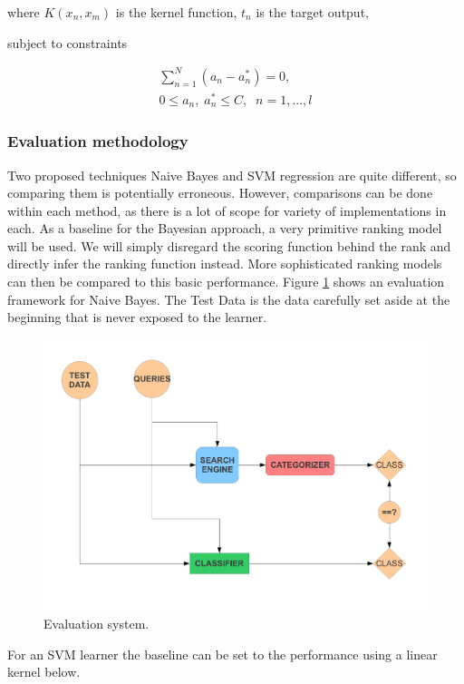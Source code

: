\documentclass[12pt,twoside,notitlepage]{report}
\begin{document}
where \(K(x_n,x_m) \) is the kernel function, \(t_n\) is the target output,

subject to constraints

\begin{gather}
  \sum_{n=1}^{N}(a_n-a_n^*)=0,\\
  0\leq a_n,\; a_n^*\leq C,\;\;    n=1,...,l 
\end{gather}

\subsubsection*{Evaluation methodology}
Two proposed techniques Naive Bayes and SVM regression are quite different, so
comparing them is potentially erroneous. However, comparisons can be done
within each method, as there is a lot of scope for variety of implementations
in each.
As a baseline for the Bayesian approach, a very primitive ranking model will be
used. We will simply disregard the scoring function behind the rank and
directly infer the ranking function instead. More sophisticated ranking models
can then be compared to this basic performance.
Figure \ref{eval} shows an evaluation framework for Naive Bayes.  The Test Data
is the data carefully set aside at the beginning that is never exposed to the
learner. 

\begin{figure}[h]
\centering
\includegraphics[scale=0.5]{figs/eval.pdf}
\caption{Evaluation system. }
\label{eval}
\end{figure}
For an SVM learner the baseline can be set to the performance using a linear
kernel below.
\end{document}
